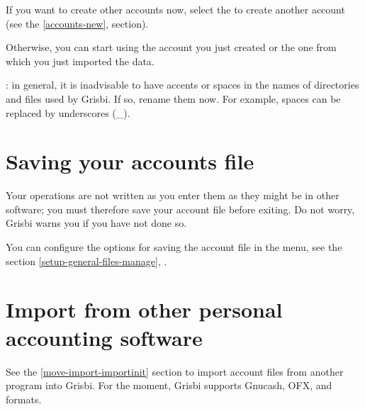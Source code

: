 
If you want to create other accounts now, select the  to create another account (see the \vref{accounts-new},  section).


Otherwise, you can start using the account you just created or the one from which you just imported the data.


 : in general, it is inadvisable to have accents or spaces in the names of directories and files used by Grisbi. If so, rename them now. For example, spaces can be replaced by underscores (_).

\newpage


\section{Saving your accounts file\label{start-save}}

Your operations are not written as you enter them as they might be in other software; you must therefore save your account file before exiting. Do not worry, Grisbi warns you if you have not done so.

You can configure the options for saving the account file in the   menu, see the section \vref{setup-general-files-manage}, .


\section{Import from other personal accounting software}

See the \vref{move-import-importinit} section to import account files from another program into Grisbi. For the moment, Grisbi supports \gls{Gnucash}, \gls{OFX},  and  formats.


